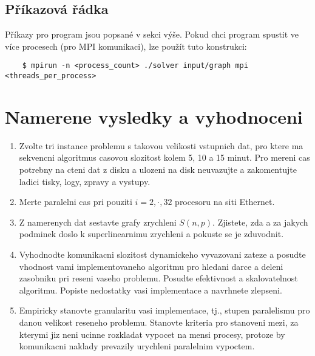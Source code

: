 \documentclass[czech]{article}
\begin{document}
\subsection{Příkazová řádka}
Příkazy pro program jsou popsané v sekci výše. Pokud chci program spustit ve více procesech (pro MPI komunikaci), lze použít tuto konstrukci:
\begin{lstlisting}
	$ mpirun -n <process_count> ./solver input/graph mpi <threads_per_process>
\end{lstlisting}

\section{Namerene vysledky a vyhodnoceni}

\begin{enumerate}
\item Zvolte tri instance problemu s takovou velikosti vstupnich dat, pro ktere ma sekvencni 
algoritmus casovou slozitost kolem 5, 10 a 15 minut.
Pro mereni cas potrebny na cteni dat z disku a ulozeni na disk neuvazujte a zakomentujte
ladici tisky, logy, zpravy a vystupy.
\item Merte paralelni cas pri pouziti $i=2,\cdot,32$ procesoru na siti Ethernet.
\item Z namerenych dat sestavte grafy zrychleni $S(n,p)$. Zjistete, zda a za jakych podminek
doslo k superlinearnimu zrychleni a pokuste se je zduvodnit.
\item Vyhodnodte komunikacni slozitost dynamickeho vyvazovani zateze a posudte
vhodnost vami implementovaneho algoritmu pro hledani darce a deleni zasobniku pri reseni vaseho
problemu. Posudte efektivnost a skalovatelnost algoritmu. Popiste nedostatky
vasi implementace a navrhnete zlepseni.
\item Empiricky stanovte 
granularitu vasi implementace, tj., stupen paralelismu pro danou velikost reseneho
problemu. Stanovte kriteria pro stanoveni mezi, za kterymi jiz neni
ucinne rozkladat vypocet na mensi procesy, protoze by komunikacni
naklady prevazily urychleni paralelnim vypoctem.

\end{enumerate}
\end{document}
